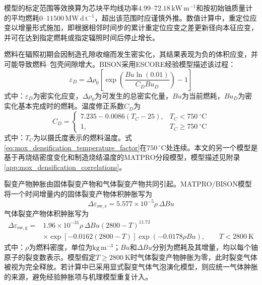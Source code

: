 模型的标定范围等效换算为芯块平均线功率$4.99$--$72.18\,\mathrm{kW\,m^{-1}}$和按初始铀质量计的平均燃耗$0$--$11500\,\mathrm{MW\,d\,t^{-1}}$，超出该范围时应谨慎外推。数值计算中，重定位应变以增量形式施加，即根据相邻时间步的累计重定位应变之差更新径向本征应变，并可在达到指定燃耗或指定辐照时间后停止增长。


燃料在辐照初期会因制造孔隙收缩而发生密实化，其结果表现为负的体积应变，并可能导致燃料--包壳间隙增大。BISON采用ESCORE经验模型描述该过程：
\begin{equation}
	\varepsilon_D
	=\Delta\rho_0
	\left[
	\exp\!\left(
	\frac{Bu\ln(0.01)}{C_DBu_D}
	\right)-1
	\right]
	\label{eq:mox_escore_densification}
\end{equation}
式中：$\varepsilon_D$为密实化应变，$\Delta\rho_0$为可发生的总密实化量，$Bu$为当前燃耗，$Bu_D$为密实化基本完成时的燃耗。温度修正系数$C_D$为
\begin{equation}
	C_D=
	\begin{cases}
		7.235-0.0086(T_C-25), & T_C<750\ ^\circ\mathrm{C}\\
		1,                    & T_C\geq750\ ^\circ\mathrm{C}
	\end{cases}
	\label{eq:mox_densification_temperature_factor}
\end{equation}
式中：$T_C$为以摄氏度表示的燃料温度。式\eqref{eq:mox_densification_temperature_factor}在$750\,{}^\circ\mathrm{C}$处连续。本文的另一个模型是基于再烧结密度变化和制造烧结温度的MATPRO分段模型，模型描述见附录\ref{app:mox_densification_correlations}。


裂变产物肿胀由固体裂变产物和气体裂变产物共同引起。MATPRO/BISON模型将一个时间增量内的固体裂变产物体积肿胀写为
\begin{equation}
	\Delta\varepsilon_{\mathrm{sw,s}}
	=5.577\times10^{-5}\rho\,\Delta Bu
	\label{eq:mox_solid_fission_product_swelling}
\end{equation}
气体裂变产物体积肿胀写为
\begin{equation}
	\begin{aligned}
		\Delta\varepsilon_{\mathrm{sw,g}}
		={}&1.96\times10^{-31}\rho\,\Delta Bu
		(2800-T)^{11.73}\\
		&\times\exp\!\left[-0.0162(2800-T)\right]
		\exp(-0.0178\rho Bu),
		\qquad T<2800\ \mathrm{K}
	\end{aligned}
	\label{eq:mox_gaseous_fission_product_swelling}
\end{equation}
式中：$\rho$为燃料密度，单位为$\mathrm{kg\,m^{-3}}$；$Bu$和$\Delta Bu$分别为燃耗及其增量，均以每个铀原子的裂变数表示。模型假定$T\geq2800\ \mathrm{K}$时气体裂变产物肿胀为零，此时裂变气体被视为完全释放。若计算中已采用显式裂变气体气泡演化模型，则应统一气体肿胀的来源，避免经验肿胀项与机理模型重复计入。

